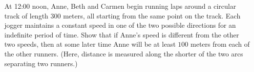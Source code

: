 At 12:00 noon, Anne, Beth and Carmen begin running laps around a circular track of length $300$ meters, all starting from the same point on the track. Each jogger maintains a constant speed in one of the two possible directions for an indefinite period of time. Show that if Anne's speed is different from the other two speeds, then at some later time Anne will be at least $100$ meters from each of the other runners.  (Here, distance is measured along the  shorter of the two arcs separating two runners.)